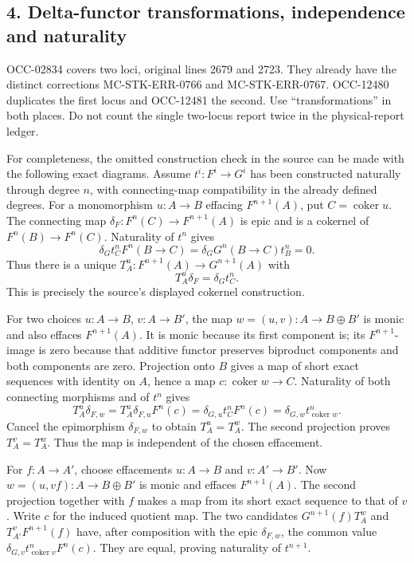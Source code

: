 \documentclass[11pt]{article}
\begin{document}
\subsection{4. Delta-functor transformations, independence and naturality}\label{note-02-delta-functor-transformations-independence-and-naturality}

OCC-02834 covers two loci, original lines 2679 and 2723. They already have the distinct corrections MC-STK-ERR-0766 and MC-STK-ERR-0767. OCC-12480 duplicates the first locus and OCC-12481 the second. Use ``transformations'' in both places. Do not count the single two-locus report twice in the physical-report ledger.

For completeness, the omitted construction check in the source can be made with the following exact diagrams. Assume \(t^i:F^i\to G^i\) has been constructed naturally through degree \(n\), with connecting-map compatibility in the already defined degrees. For a monomorphism \(u:A\to B\) effacing \(F^{n+1}(A)\), put \(C=\operatorname{coker}u\). The connecting map \(\delta_F:F^n(C)\to F^{n+1}(A)\) is epic and is a cokernel of \(F^n(B)\to F^n(C)\). Naturality of \(t^n\) gives \[
\delta_Gt_C^nF^n(B\to C)
=\delta_GG^n(B\to C)t_B^n=0.
\] Thus there is a unique \(T_A^u:F^{n+1}(A)\to G^{n+1}(A)\) with \[
T_A^u\delta_F=\delta_Gt_C^n.
\] This is precisely the source's displayed cokernel construction.

For two choices \(u:A\to B\), \(v:A\to B'\), the map \(w=(u,v):A\to B\oplus B'\) is monic and also effaces \(F^{n+1}(A)\). It is monic because its first component is; its \(F^{n+1}\)-image is zero because that additive functor preserves biproduct components and both components are zero. Projection onto \(B\) gives a map of short exact sequences with identity on \(A\), hence a map \(c:\operatorname{coker}w\to C\). Naturality of both connecting morphisms and of \(t^n\) gives \[
T_A^u\delta_{F,w}
=T_A^u\delta_{F,u}F^n(c)
=\delta_{G,u}t_C^nF^n(c)
=\delta_{G,w}t_{\operatorname{coker}w}^n.
\] Cancel the epimorphism \(\delta_{F,w}\) to obtain \(T_A^u=T_A^w\). The second projection proves \(T_A^v=T_A^w\). Thus the map is independent of the chosen effacement.

For \(f:A\to A'\), choose effacements \(u:A\to B\) and \(v:A'\to B'\). Now \(w=(u,vf):A\to B\oplus B'\) is monic and effaces \(F^{n+1}(A)\). The second projection together with \(f\) makes a map from its short exact sequence to that of \(v\). Write \(c\) for the induced quotient map. The two candidates \(G^{n+1}(f)T_A^w\) and \(T_{A'}^vF^{n+1}(f)\) have, after composition with the epic \(\delta_{F,w}\), the common value \(\delta_{G,v}t_{\operatorname{coker}v}^nF^n(c)\). They are equal, proving naturality of \(t^{n+1}\).
\end{document}
